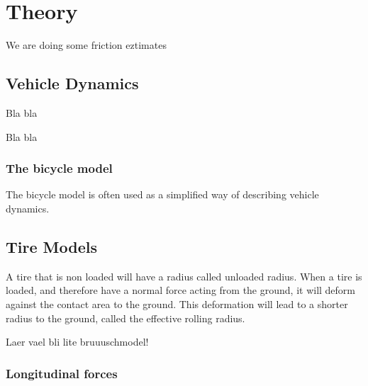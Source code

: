 \chapter{Theory}


We are doing some friction eztimates

\section{Vehicle Dynamics}

Bla bla \cite{fordonsdynamik}

Bla bla \cite{pacejka}

\subsection{The bicycle model}

The bicycle model is often used as a simplified way of describing vehicle dynamics. 

\section{Tire Models}

A tire that is non loaded will have a radius called unloaded radius. When a tire is loaded, and therefore have a normal force acting from the ground, it will deform against the contact area to the ground. This deformation will lead to a shorter radius to the ground, called the effective rolling radius. 

Laer vael bli lite bruuuschmodel!

\subsection{Longitudinal forces}

